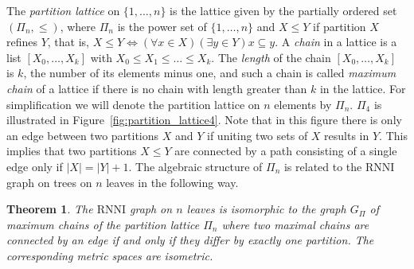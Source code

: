 \documentclass[11pt]{amsart}
\newtheorem{theorem}{Theorem}
\newcommand{\rnni}{\mathrm{RNNI}}
\begin{document}
The \emph{partition lattice} on $\{1, \ldots, n\}$ is the lattice given by the partially ordered set $(\Pi_n, \leq)$, where $\Pi_n$ is the power set of $\{1, \ldots, n\}$ and $X \leq Y$ if partition $X$ refines $Y$, that is, $X \leq Y \Leftrightarrow (\forall x \in X)(\exists y \in Y) x \subseteq y$.
A \emph{chain} in a lattice is a list $[X_0, \ldots, X_k]$ with $X_0 \leq X_1 \leq \ldots \leq X_k$.
The \emph{length} of the chain $[X_0, \ldots, X_k]$ is $k$, the number of its elements minus one, and such a chain is called \emph{maximum chain} of a lattice if there is no chain with length greater than $k$ in the lattice.
For simplification we will denote the partition lattice on $n$ elements by $\Pi_n$.
$\Pi_4$ is illustrated in Figure~\ref{fig:partition_lattice4}.
Note that in this figure there is only an edge between two partitions $X$ and $Y$ if uniting two sets of $X$ results in $Y$.
This implies that two partitions $X \leq Y$ are connected by a path consisting of a single edge only if $|X| = |Y| + 1$.
The algebraic structure of $\Pi_n$ is related to the $\rnni$ graph on trees on $n$ leaves in the following way.

\begin{theorem}
	The $\rnni$ graph on $n$ leaves is isomorphic to the graph $G_{\Pi}$ of maximum chains of the partition lattice $\Pi_n$ where two maximal chains are connected by an edge if and only if they differ by exactly one partition.
	The corresponding metric spaces are isometric.
	\label{thm:partition_lattice}
\end{theorem}
\end{document}
